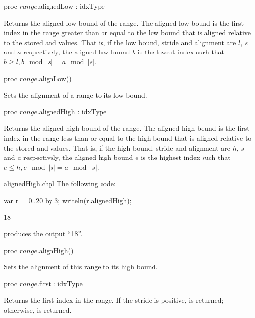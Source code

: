 \begin{protohead}
proc $range$.alignedLow : idxType
\end{protohead}
\begin{protobody}
Returns the aligned low bound of the range.  
The aligned low bound is the first
index in the range greater than or equal to the low bound that is
aligned relative to the stored  and  values.  That
is, if the low bound, stride and alignment are $l$, $s$ and $a$ respectively,
the aligned low bound $b$ is the lowest index such that $b \geq l, b\!\mod |s| =
a\!\mod |s|$.
\end{protobody}

\begin{protohead}
proc $range$.alignLow()
\end{protohead}
\begin{protobody}
Sets the alignment of a range to its low bound.
\end{protobody}

\begin{protohead}
proc $range$.alignedHigh : idxType
\end{protohead}
\begin{protobody}
Returns the aligned high bound of the range.  
The aligned high bound is the first
index in the range less than or equal to the high bound that is
aligned relative to the stored  and  values.  That
is, if the high bound, stride and alignment are $h$, $s$ and $a$ respectively,
the aligned high bound $e$ is the highest index such that $e \leq h, e\!\mod |s| =
a\!\mod |s|$.
\end{protobody}
\begin{chapelexample}{alignedHigh.chpl}
The following code:
\begin{chapel}
var r = 0..20 by 3;
writeln(r.alignedHigh);
\end{chapel}
\begin{chapeloutput}
18
\end{chapeloutput}
produces the output ``18''.
\end{chapelexample}

\begin{protohead}
proc $range$.alignHigh()
\end{protohead}
\begin{protobody}
Sets the alignment of this range to its high bound.
\end{protobody}

\begin{protohead}
proc $range$.first : idxType
\end{protohead}
\begin{protobody}
Returns the first index in the range.  If the stride is positive,
 is returned; otherwise,  is returned.
\end{protobody}

